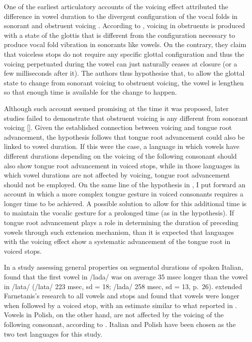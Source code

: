 \documentclass[authoryear, twocolumn]{elsarticle}
\begin{document}
One of the earliest articulatory accounts of the voicing effect
attributed the difference in vowel duration to the divergent
configuration of the vocal folds in sonorant and obstruent voicing
\citetext{\citealp{halle1967}; \citealp[reiterated in][]{chomsky1968}}.
According to \citet{halle1967}, voicing in obstruents is produced with a
state of the glottis that is different from the configuration necessary
to produce vocal fold vibration in sonorants like vowels. On the
contrary, they claim that voiceless stops do not require any specific
glottal configuration and thus the voicing perpetuated during the vowel
can just naturally ceases at closure (or a few milliseconds after it).
The authors thus hypothesise that, to allow the glottal state to change
from sonorant voicing to obstruent voicing, the vowel is lengthen so
that enough time is available for the change to happen.

Although such account seemed promising at the time it was proposed,
later studies failed to demonstrate that obstruent voicing is any
different from sonorant voicing {[}{]}. Given the established connection
between voicing and tongue root advancement, the hypothesis follows that
tongue root advancement could also be linked to vowel duration. If this
were the case, a language in which vowels have different durations
depending on the voicing of the following consonant should also show
tongue root advancement in voiced stops, while in those languages in
which vowel durations are not affected by voicing, tongue root
advancement should not be employed. On the same line of the hypothesis
in \citet{halle1967}, I put forward an account in which a more complex
tongue gesture in voiced consonants requires a longer time to be
achieved. A possible solution to allow for this additional time is to
maintain the vocalic gesture for a prolonged time (as in the
\citet{halle1967} hypothesis). If tongue root advancement plays a role
in determining the duration of preceding vowels through such extension
mechanism, than it is expected that languages with the voicing effect
show a systematic advancement of the tongue root in voiced stops.

In a study assessing general properties on segmental durations of spoken
Italian, \citet{farnetani1986} found that the first vowel in /lada/ was
on average 35 msec longer than the vowel in /lata/ (/lata/ 223 msec, sd
= 18; /lada/ 258 msec, sd = 13, p.~26). \citet{esposito2002} extended
Farnetanis's research to all vowels and stops and found that vowels were
longer when followed by a voiced stop, with an estimate similar to what
reported in \citet{farnetani1986}. Vowels in Polish, on the other hand,
are not affected by the voicing of the following consonant, according to
\citet{keating1984}. Italian and Polish have been chosen as the two test
languages for this study.
\end{document}
